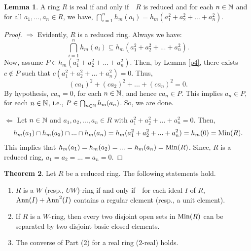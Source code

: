 \documentclass{amsart}
\theoremstyle{definition}
\theoremstyle{remark}
\numberwithin{equation}{section}
\newcommand{\Ann}{{\rm Ann}}
\newcommand{\Min}{{\rm Min}}
\def\ifif {if and only if\ \ }
\theoremstyle{definition}\newtheorem{thm}{Theorem}[section]
\theoremstyle{definition}\newtheorem{cor}[thm]{Corollary}
\theoremstyle{definition}\newtheorem{lem}[thm]{Lemma}
\theoremstyle{definition}\newtheorem{prop}[thm]{Proposition}
\theoremstyle{definition}\newtheorem{defn}[thm]{Definition}
\theoremstyle{definition}\newtheorem{Rem}[thm]{Remark}
\theoremstyle{remark}\newtheorem{rem}[thm]{Remark}
\theoremstyle{definition}\newtheorem{exam}[thm]{Example}
\theoremstyle{definition}\newtheorem{qu}[thm]{question}
\begin{document}
\begin{lem}\label{AR}
A ring $R$ is real \ifif $R$ is reduced and for each $n\in\Bbb N$ and for all $a_1, ..., a_n\in R$, we have,    $\bigcap_{i=1}^{n}h_m(a_i)=h_m(a_1^2+ a_2^2+ ... + a_n^2)$.
\end{lem}
\begin{proof}
$\Rightarrow$ Evidently, $R$ is a reduced ring. Always we have: \[\bigcap_{i=1}^{n}h_m(a_i)\subseteq h_m(a_1^2+ a_2^2+ ... + a_n^2).\] Now, assume $P\in h_m(a_1^2+ a_2^2+ ... + a_n^2)$. Then, by Lemma  \ref{p4}, there exists $c\notin P$ such that $c(a_1^2+ a_2^2+ ... + a_n^2)=0$. Thus, \[(ca_1)^2+ (ca_2)^2+...+ (ca_{n})^2=0.\] By hypothesis, $ca_n=0$, for each $n\in\Bbb N$, and hence $ca_n\in P$. This implies $a_n\in P$, for each $n\in\Bbb N$, i.e., $P\in \bigcap_{n\in\Bbb N}h_m(a_n)$. So, we are done.

$\Leftarrow$  Let $n\in\Bbb N$ and $a_1, a_2,..., a_n\in R$ with $a_1^2+ a_2^2+...+ a_n^2=0$. Then, \[h_m(a_1)\cap h_m(a_2)\cap ... \cap h_m(a_n)= h_m(a_1^2+ a_2^2+...+ a_n^2)=h_m(0)=\Min(R).\] This implies that $h_m(a_1)=h_m(a_2)=...=h_m(a_n)=\Min(R)$.  Since, $R$ is a reduced ring, $a_1= a_2=...= a_n=0$.
\end{proof}
\begin{thm}\label{AR1}
Let $R$ be a reduced ring. The following statements hold.
\begin{enumerate}
\item $R$ is  a $W$ (resp., $UW$)-ring \ifif for each  ideal $I$ of $R$, $\Ann(I)+\Ann^{2}(I)$ contains a regular element (resp., a unit element).
 
\item If $R$ is a $W$-ring, then every two disjoint open sets in $\Min(R)$ can be separated by two disjoint basic closed elements. 

\item The converse of Part (2) for  a real ring ($2$-real) holds. 
\end{enumerate}
\end{thm}
\end{document}
